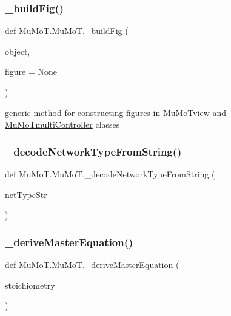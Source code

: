 \subsubsection{\texorpdfstring{\+\_\+build\+Fig()}{\_buildFig()}}
{\footnotesize\ttfamily def Mu\+Mo\+T.\+Mu\+Mo\+T.\+\_\+build\+Fig (\begin{DoxyParamCaption}\item[{}]{object,  }\item[{}]{figure = {\ttfamily None} }\end{DoxyParamCaption})\hspace{0.3cm}{\ttfamily [private]}}



generic method for constructing figures in \hyperlink{class_mu_mo_t_1_1_mu_mo_t_1_1_mu_mo_tview}{Mu\+Mo\+Tview} and \hyperlink{class_mu_mo_t_1_1_mu_mo_t_1_1_mu_mo_tmulti_controller}{Mu\+Mo\+Tmulti\+Controller} classes 

\mbox{\label{namespace_mu_mo_t_1_1_mu_mo_t_ac34bd5f10896d28b40c1eaaaab1dd66f}} 
\subsubsection{\texorpdfstring{\+\_\+decode\+Network\+Type\+From\+String()}{\_decodeNetworkTypeFromString()}}
{\footnotesize\ttfamily def Mu\+Mo\+T.\+Mu\+Mo\+T.\+\_\+decode\+Network\+Type\+From\+String (\begin{DoxyParamCaption}\item[{}]{net\+Type\+Str }\end{DoxyParamCaption})\hspace{0.3cm}{\ttfamily [private]}}

\mbox{\label{namespace_mu_mo_t_1_1_mu_mo_t_a08c33c3f09bc345041d89861f4fb86af}} 
\subsubsection{\texorpdfstring{\+\_\+derive\+Master\+Equation()}{\_deriveMasterEquation()}}
{\footnotesize\ttfamily def Mu\+Mo\+T.\+Mu\+Mo\+T.\+\_\+derive\+Master\+Equation (\begin{DoxyParamCaption}\item[{}]{stoichiometry }\end{DoxyParamCaption})\hspace{0.3cm}{\ttfamily [private]}}



